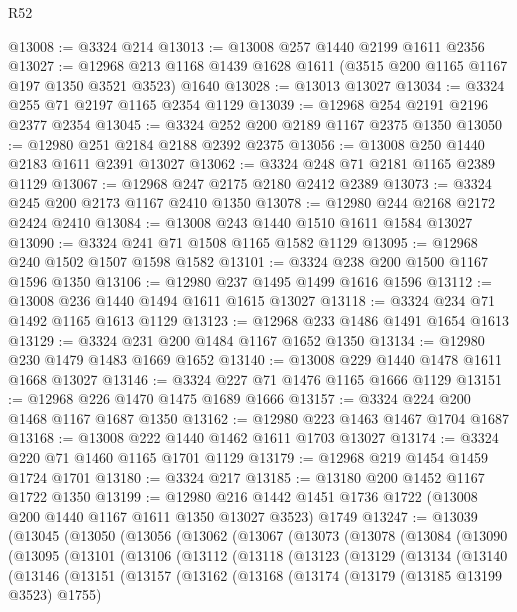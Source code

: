 \begin{lexlean}{R52}
\begin{coremodule}
@13008 := @3324 @214
@13013 := @13008 @257 @1440 @2199 @1611 @2356
@13027 := @12968 @213 @1168 @1439 @1628 @1611 (@3515 @200 @1165 @1167 @197 @1350 @3521 @3523) @1640
@13028 := @13013 @13027
@13034 := @3324 @255 @71 @2197 @1165 @2354 @1129
@13039 := @12968 @254 @2191 @2196 @2377 @2354
@13045 := @3324 @252 @200 @2189 @1167 @2375 @1350
@13050 := @12980 @251 @2184 @2188 @2392 @2375
@13056 := @13008 @250 @1440 @2183 @1611 @2391 @13027
@13062 := @3324 @248 @71 @2181 @1165 @2389 @1129
@13067 := @12968 @247 @2175 @2180 @2412 @2389
@13073 := @3324 @245 @200 @2173 @1167 @2410 @1350
@13078 := @12980 @244 @2168 @2172 @2424 @2410
@13084 := @13008 @243 @1440 @1510 @1611 @1584 @13027
@13090 := @3324 @241 @71 @1508 @1165 @1582 @1129
@13095 := @12968 @240 @1502 @1507 @1598 @1582
@13101 := @3324 @238 @200 @1500 @1167 @1596 @1350
@13106 := @12980 @237 @1495 @1499 @1616 @1596
@13112 := @13008 @236 @1440 @1494 @1611 @1615 @13027
@13118 := @3324 @234 @71 @1492 @1165 @1613 @1129
@13123 := @12968 @233 @1486 @1491 @1654 @1613
@13129 := @3324 @231 @200 @1484 @1167 @1652 @1350
@13134 := @12980 @230 @1479 @1483 @1669 @1652
@13140 := @13008 @229 @1440 @1478 @1611 @1668 @13027
@13146 := @3324 @227 @71 @1476 @1165 @1666 @1129
@13151 := @12968 @226 @1470 @1475 @1689 @1666
@13157 := @3324 @224 @200 @1468 @1167 @1687 @1350
@13162 := @12980 @223 @1463 @1467 @1704 @1687
@13168 := @13008 @222 @1440 @1462 @1611 @1703 @13027
@13174 := @3324 @220 @71 @1460 @1165 @1701 @1129
@13179 := @12968 @219 @1454 @1459 @1724 @1701
@13180 := @3324 @217
@13185 := @13180 @200 @1452 @1167 @1722 @1350
@13199 := @12980
    @216
    @1442
    @1451
    @1736
    @1722
    (@13008 @200 @1440 @1167 @1611 @1350 @13027 @3523)
    @1749
@13247 := @13039
    (@13045
      (@13050
        (@13056
          (@13062
            (@13067
              (@13073
                (@13078
                  (@13084
                    (@13090
                      (@13095
                        (@13101
                          (@13106
                            (@13112
                              (@13118
                                (@13123
                                  (@13129
                                    (@13134
                                      (@13140
                                        (@13146
                                          (@13151
                                            (@13157
                                              (@13162
                                                (@13168
                                                  (@13174
                                                    (@13179 (@13185 @13199 @3523) @1755)

\end{coremodule}
\end{lexlean}
